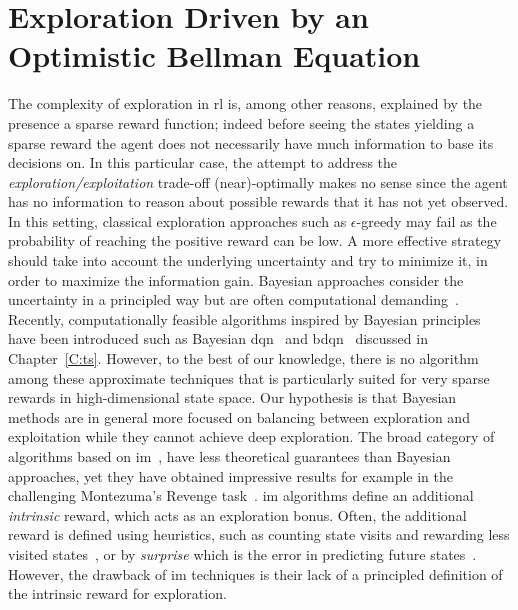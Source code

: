 \chapter{Exploration Driven by an Optimistic Bellman Equation}\label{C:opt}
The complexity of exploration in \gls{rl} is, among other reasons, explained by the presence a sparse reward function; indeed before seeing the states yielding a sparse reward the agent does not necessarily have much information to base its decisions on. In this particular case, the attempt to address the \textit{exploration/exploitation} trade-off (near)-optimally makes no
sense since the agent has no information to reason about possible
rewards that it has not yet observed. In this setting, classical exploration
approaches such as $\epsilon$-greedy may fail as the probability of
reaching the positive reward can be low. A more effective strategy
should take into account the underlying uncertainty and try to
minimize it, in order to maximize the information gain. Bayesian approaches consider the uncertainty
in a principled way but are often
computational demanding~\cite{vlassis2012bayesian,engel2005reinforcement}. Recently, computationally feasible
algorithms inspired by Bayesian principles have been
introduced such as Bayesian \gls{dqn}~\cite{azizzadenesheli2517efficient} and \gls{bdqn}~\cite{osband2017deep} discussed in Chapter~\ref{C:ts}.
However, to the best of our knowledge, there is no algorithm among these approximate techniques that is particularly suited for very sparse rewards in high-dimensional state space. Our hypothesis is that Bayesian methods are
in general more focused on balancing between exploration and
exploitation while they cannot achieve deep exploration. The broad
category of algorithms based on \gls{im}~\cite{singh2004intrinsically}, have less theoretical guarantees
than Bayesian approaches, yet they have obtained impressive results
for example in the challenging Montezuma's Revenge task~\cite{bellemare2016unifying}. \gls{im}
algorithms define an additional \textit{intrinsic} reward, which acts as an exploration bonus. Often, the additional
reward is defined using heuristics, such as counting state visits and
rewarding less visited states~\cite{ostrovski2017count}, or by
\textit{surprise} which is the error in predicting future
states~\cite{pathak2017curiosity}. However, the drawback of \gls{im} techniques is
their lack of a principled definition of the intrinsic reward for exploration.

